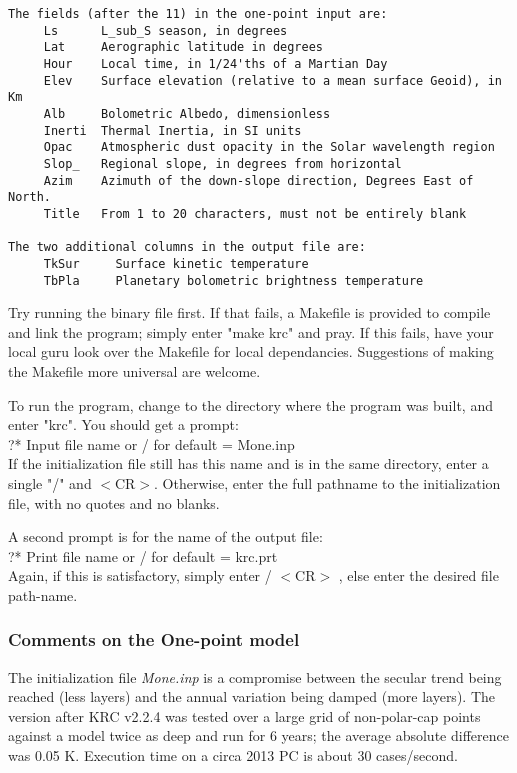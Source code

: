 \documentclass{article}
\newcommand{\qi}{\\ \hspace*{2.em}}      %
\newcommand{\nf}{\textit}  %
\begin{document}
\vspace{-3.mm} 
\begin{verbatim}
The fields (after the 11) in the one-point input are:
     Ls      L_sub_S season, in degrees
     Lat     Aerographic latitude in degrees
     Hour    Local time, in 1/24'ths of a Martian Day
     Elev    Surface elevation (relative to a mean surface Geoid), in Km
     Alb     Bolometric Albedo, dimensionless
     Inerti  Thermal Inertia, in SI units
     Opac    Atmospheric dust opacity in the Solar wavelength region
     Slop_   Regional slope, in degrees from horizontal
     Azim    Azimuth of the down-slope direction, Degrees East of North.
     Title   From 1 to 20 characters, must not be entirely blank

The two additional columns in the output file are:
     TkSur     Surface kinetic temperature
     TbPla     Planetary bolometric brightness temperature
\end{verbatim}

Try running the binary file first. If that fails, a Makefile is provided to
compile and link the program; simply enter "make krc" and pray. If this fails,
have your local guru look over the Makefile for local dependancies. Suggestions
of making the Makefile more universal are welcome.

To run the program, change to the directory where the program was built, and
enter "krc". You should get a prompt:
 \qi      ?* Input file name or / for default = Mone.inp  \\
If the initialization file still has this name and is in the same directory,
enter a single "/" and $<$CR$>$. Otherwise, enter the full pathname to the 
initialization file, with no quotes and no blanks.

A second prompt is for the name of the output file: 
 \qi         ?* Print file name or / for default = krc.prt \\
Again, if this is satisfactory, simply enter  / $<$CR$>$ , else enter the desired
file path-name.

\subsubsection{ Comments on the One-point model} %

The initialization file \nf{Mone.inp} is a compromise between the secular trend
being reached (less layers) and the annual variation being damped (more
layers). The version after KRC v2.2.4 was tested over a large grid of
non-polar-cap points against a model twice as deep and run for 6 years; the
average absolute difference was 0.05 K. Execution time on a circa 2013 PC is
about 30 cases/second.
\end{document}
